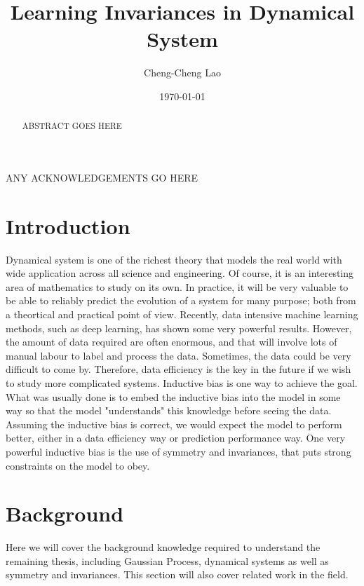 \documentclass{statsmsc}
\title{Learning Invariances in Dynamical System}
\author{Cheng-Cheng Lao}
\date{\today}
\begin{document}
\maketitle


\declarationdate{\today}
\declaration 


\begin{abstract}
    ABSTRACT GOES HERE
\end{abstract}

\begin{acknowledgements}
    ANY ACKNOWLEDGEMENTS GO HERE
\end{acknowledgements}


\mainmatter


\chapter{Introduction}
Dynamical system is one of the richest theory that models the real world with wide application across all science and engineering. 
Of course, it is an interesting area of mathematics to study on its own.
In practice, it will be very valuable to be able to reliably predict the evolution of a system for many purpose; both from a theortical and practical point of view.
Recently, data intensive machine learning methods, such as deep learning, has shown some very powerful results. 
However, the amount of data required are often enormous, and that will involve lots of manual labour to label and process the data.
Sometimes, the data could be very difficult to come by.
Therefore, data efficiency is the key in the future if we wish to study more complicated systems.
Inductive bias is one way to achieve the goal.
What was usually done is to embed the inductive bias into the model in some way so that the model "understands" this knowledge before seeing the data.
Assuming the inductive bias is correct, we would expect the model to perform better, either in a data efficiency way or prediction performance way.
One very powerful inductive bias is the use of symmetry and invariances, that puts strong constraints on the model to obey.



\chapter{Background}
Here we will cover the background knowledge required to understand the remaining thesis, including Gaussian Process, dynamical systems as well as symmetry and invariances. 
This section will also cover related work in the field.
\end{document}

